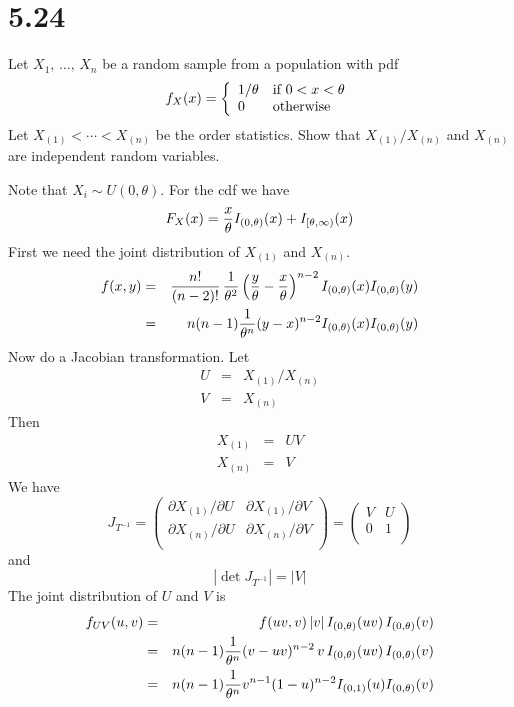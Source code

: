 \section*{5.24}
Let $X_1,\,\ldots,\,X_n$ be a random sample from a population with
pdf
$$
f_X(x)=\left\{
\begin{array}{ll}
1/\theta & \hbox{if $0<x<\theta$}\\
0 & \hbox{otherwise}
\end{array}\right.
$$
Let $X_{(1)}<\cdots<X_{(n)}$ be the order statistics.
Show that $X_{(1)}/X_{(n)}$ and $X_{(n)}$ are independent random
variables.

\bigskip
\noindent
Note that $X_i\sim U(0,\theta)$. For the cdf we have
$$F_X(x)={x\over\theta}I_{(0,\theta)}(x)+I_{[\theta,\infty)}(x)$$
First we need the joint distribution of $X_{(1)}$ and $X_{(n)}$.
\begin{eqnarray*}
f(x,y)&=&
{n!\over(n-2)!}
\,{1\over\theta^2}
\left({y\over\theta}-{x\over\theta}\right)^{n-2}
I_{(0,\theta)}(x)I_{(0,\theta)}(y)\\
&=&n(n-1){1\over\theta^n}
(y-x)^{n-2}I_{(0,\theta)}(x)I_{(0,\theta)}(y)
\end{eqnarray*}
Now do a Jacobian transformation.
Let
\begin{eqnarray*}
U&=&X_{(1)}/X_{(n)}\\
V&=&X_{(n)}
\end{eqnarray*}
Then
\begin{eqnarray*}
X_{(1)}&=&UV\\
X_{(n)}&=&V
\end{eqnarray*}
We have
$$J_{T^{-1}}=\left(\begin{matrix}
\partial X_{(1)}/\partial U &
\partial X_{(1)}/\partial V\\
\partial X_{(n)}/\partial U &
\partial X_{(n)}/\partial V\\
\end{matrix}\right)
=\left(\begin{matrix}
V & U\\
0 & 1\\
\end{matrix}\right)
$$
and
$$|\det J_{T^{-1}}|=|V|$$
The joint distribution of $U$ and $V$ is
\begin{eqnarray*}
f_{UV}(u,v)&=&f(uv,v)\,|v|\,
I_{(0,\theta)}(uv)\,I_{(0,\theta)}(v)\\
&=&
n(n-1)
{1\over\theta^n}
(v-uv)^{n-2}
\,v\,
I_{(0,\theta)}(uv)\,I_{(0,\theta)}(v)\\
&=&
n(n-1)
{1\over\theta^n}
v^{n-1}(1-u)^{n-2}
I_{(0,1)}(u)I_{(0,\theta)}(v)\\
\end{eqnarray*}
